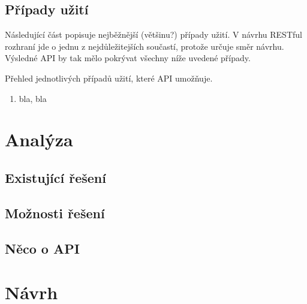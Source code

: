 \documentclass[thesis=B,czech]{FITthesis}[2012/06/26]
\begin{document}
\section{Případy užití}

Následující část popisuje nejběžnější (většinu?) případy užití. V návrhu RESTful rozhraní jde
o jednu z nejdůležitejších součastí, protože určuje směr návrhu. Výsledné API by tak mělo
pokrývat všechny níže uvedené případy.

Přehled jednotlivých případů užití, které API umožňuje.

\begin{enumerate}
\item bla, bla
\end{enumerate}

\chapter{Analýza}

\section{Existující řešení}


\section{Možnosti řešení}


\section{Něco o API}


\chapter{Návrh}
\end{document}
